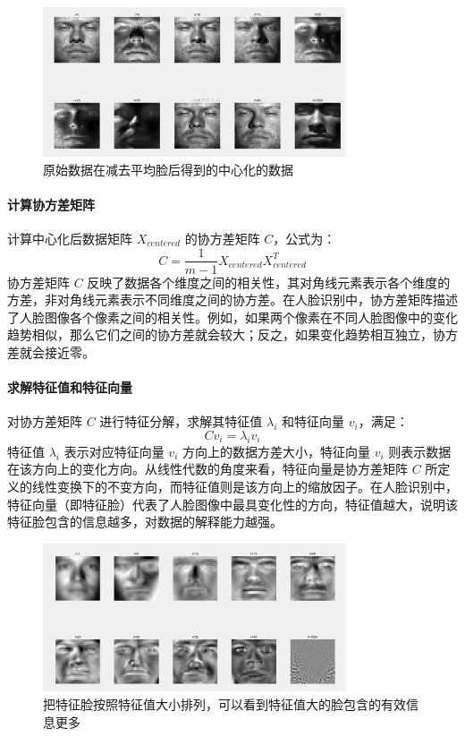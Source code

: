 \documentclass{article}
\begin{document}
\begin{figure}[H]
    \centering
    \includegraphics[width=0.8\textwidth]{Img/v2-65a459d10dbf796dcd4dbfec736c810a_1440w.png}
    \caption{原始数据在减去平均脸后得到的中心化的数据}
\end{figure}

\paragraph{计算协方差矩阵}
计算中心化后数据矩阵 $X_{centered}$ 的协方差矩阵 $C$，公式为：
\[
C=\frac{1}{m - 1}X_{centered}X_{centered}^{T}
\]
协方差矩阵 $C$ 反映了数据各个维度之间的相关性，其对角线元素表示各个维度的方差，非对角线元素表示不同维度之间的协方差。在人脸识别中，协方差矩阵描述了人脸图像各个像素之间的相关性。例如，如果两个像素在不同人脸图像中的变化趋势相似，那么它们之间的协方差就会较大；反之，如果变化趋势相互独立，协方差就会接近零。

\paragraph{求解特征值和特征向量}
对协方差矩阵 $C$ 进行特征分解，求解其特征值 $\lambda_{i}$ 和特征向量 $v_{i}$，满足：
\[
Cv_{i}=\lambda_{i}v_{i}
\]
特征值 $\lambda_{i}$ 表示对应特征向量 $v_{i}$ 方向上的数据方差大小，特征向量 $v_{i}$ 则表示数据在该方向上的变化方向。从线性代数的角度来看，特征向量是协方差矩阵 $C$ 所定义的线性变换下的不变方向，而特征值则是该方向上的缩放因子。在人脸识别中，特征向量（即特征脸）代表了人脸图像中最具变化性的方向，特征值越大，说明该特征脸包含的信息越多，对数据的解释能力越强。

\begin{figure}[H]
    \centering
    \includegraphics[width=0.8\textwidth]{Img/v2-62f392d4e1056457c15ccb4dd81dc539_1440w.png}
    \caption{把特征脸按照特征值大小排列，可以看到特征值大的脸包含的有效信息更多}
\end{figure}
\end{document}

